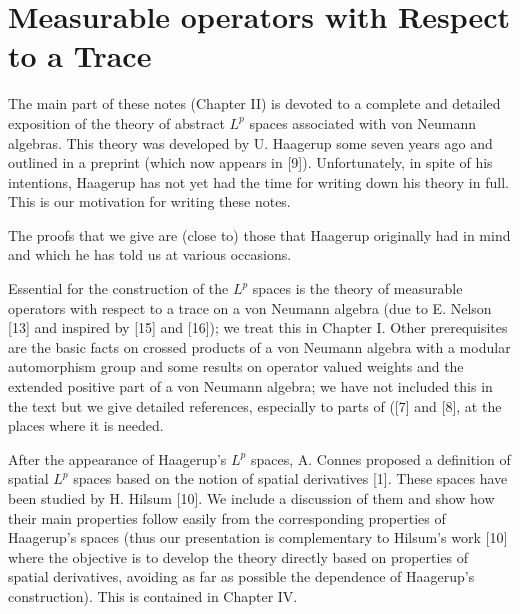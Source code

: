
% 
\chapter{Measurable operators with Respect to a Trace}
The main part of these notes (Chapter II) is devoted to a complete and detailed exposition of the theory of abstract $L^p$ spaces associated with von Neumann algebras. This theory was developed by U. Haagerup some seven years ago and outlined in a preprint (which now appears in [9]). Unfortunately, in spite of his intentions, Haagerup has not yet had the time for writing down his theory in full. This is our motivation for writing these notes.\par
The proofs that we give are (close to) those that Haagerup originally had in mind and which he has told us at various occasions.\par
Essential for the construction of the $L^p$ spaces is the theory of measurable operators with respect to a trace on a von Neumann algebra (due to E. Nelson [13] and inspired by [15] and [16]); we treat this in Chapter I. Other prerequisites are the basic facts on crossed products of a von Neumann algebra with a modular automorphism group and some results on operator valued weights and the extended positive part of a von Neumann algebra; we have not included this in the text but we give detailed references, especially to parts of ([7] and [8], at the places where it is needed.\par
After the appearance of Haagerup's $L^p$ spaces, A. Connes proposed a definition of spatial $L^p$ spaces based on the notion of spatial derivatives [1]. These spaces have been studied by H. Hilsum [10]. We include a discussion of them and show how their main properties follow easily from the corresponding properties of Haagerup's spaces (thus our presentation is complementary to Hilsum's work [10] where the objective is to develop the theory directly based on properties of spatial derivatives, avoiding as far as possible the dependence of Haagerup's construction). This is contained in Chapter IV.\par

